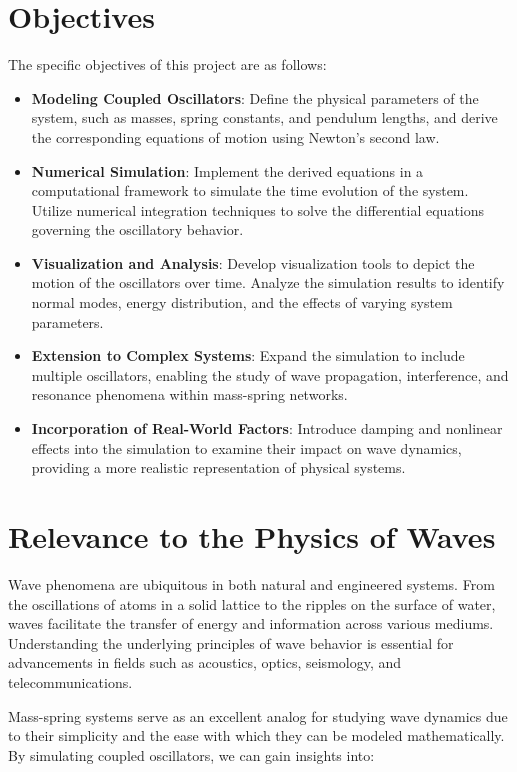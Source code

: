 \documentclass[12pt]{report} %
\begin{document}
\section{Objectives}

The specific objectives of this project are as follows:

\begin{itemize}
    \item \textbf{Modeling Coupled Oscillators}: Define the physical parameters of the system, such as masses, spring constants, and pendulum lengths, and derive the corresponding equations of motion using Newton’s second law.
    \item \textbf{Numerical Simulation}: Implement the derived equations in a computational framework to simulate the time evolution of the system. Utilize numerical integration techniques to solve the differential equations governing the oscillatory behavior.
    \item \textbf{Visualization and Analysis}: Develop visualization tools to depict the motion of the oscillators over time. Analyze the simulation results to identify normal modes, energy distribution, and the effects of varying system parameters.
    \item \textbf{Extension to Complex Systems}: Expand the simulation to include multiple oscillators, enabling the study of wave propagation, interference, and resonance phenomena within mass-spring networks.
    \item \textbf{Incorporation of Real-World Factors}: Introduce damping and nonlinear effects into the simulation to examine their impact on wave dynamics, providing a more realistic representation of physical systems.
\end{itemize}

\section{Relevance to the Physics of Waves}

Wave phenomena are ubiquitous in both natural and engineered systems. From the oscillations of atoms in a solid lattice to the ripples on the surface of water, waves facilitate the transfer of energy and information across various mediums. Understanding the underlying principles of wave behavior is essential for advancements in fields such as acoustics, optics, seismology, and telecommunications.

Mass-spring systems serve as an excellent analog for studying wave dynamics due to their simplicity and the ease with which they can be modeled mathematically. By simulating coupled oscillators, we can gain insights into:
\end{document}
